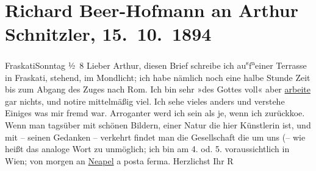 

         \newcommand{\erwaehnteOrte}{Orte: Frascati, Neapel, Rom, Wien}
         \newcommand{\erwaehnteWerke}{Werke: Die Kraniche des Ibykus}
               \section[Richard Beer-Hofmann an Arthur Schnitzler, 15. 10. 1894]{ Richard Beer-Hofmann an Arthur Schnitzler, 15. 10. 1894}\nopagebreak{}\rehead{ }\begin{ledgroupsized}[t]{13cm}\normalsize\beginnumbering \toendnotes[C]{\smallbreak\pagebreak[2]} 
\toendnotes[C]{\smallbreak}\pstart
           \raggedleft{}{\pb}FraskatiSonntag{ }½ 8\pend
           \pstart
           {\pb}Lieber Arthur, diesen Brief schreibe ich au\substVorne{}\textsuperscript{s}\substDazwischen{}f\substHinten{}{ }\substVorne{}\textsuperscript{a}\substDazwischen{}e\substHinten{}iner Terrasse  in Fraskati, stehend, im Mondlicht; ich habe nämlich noch eine halbe
               Stunde Zeit bis zum Abgang des Zuges nach Rom.
                  {\pb}Ich bin sehr »des Gottes voll« aber \uline{arbeite}
               gar nichts, und notire mittelmäßig viel. Ich sehe vieles anders und verstehe Einiges
               was mir fremd war. Arroganter werd ich {\pb}sein als je, wenn ich zurückko{\geminationm}e. Wenn man tagsüber mit schönen Bildern, einer Natur
               die hier Künstlerin ist, und mit – seinen Gedanken – verkehrt {\pb}findet man die Gesellschaft die um
               uns (– wie heißt das analoge Wort zu\pend
           \settowidth{\longeste}{crepiren!}\settowidth{\longestz}{–}\settowidth{\longestd}{sterben}\settowidth{\longestv}{}\settowidth{\longestf}{}\addtolength\longeste{1em}
        \addtolength\longestz{1em}
        \addtolength\longestd{1em}
      \pstart\noindent{}
                  \pend\pstart\noindent{}
                  \pend\pstart
           unmöglich; ich bin am 4. od. 5. voraussichtlich in
                  Wien; von morgen an \uline{Neapel} a posta ferma.\pend
           \pstart Herzlichst Ihr \spacefill\mbox{R}\pend{}
         

\end{ledgroupsized}

